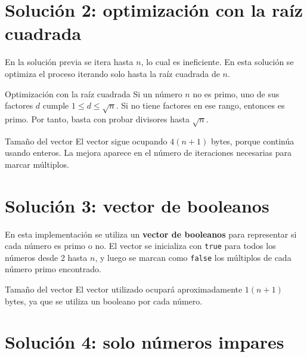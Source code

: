 \documentclass[
  spanish,
  11pt,
  a4paper,
  DIV=11,
  numbers=noendperiod]{scrartcl}
\begin{document}
\section{Solución 2: optimización con la raíz cuadrada}\label{solucion-2-optimizacion-con-la-raiz-cuadrada}

En la solución previa se itera hasta \(n\), lo cual es ineficiente. En esta solución se optimiza el proceso iterando solo hasta la raíz cuadrada de \(n\).

\begin{PracticeWarningBox}{Optimización con la raíz cuadrada}
Si un número \(n\) no es primo, uno de sus factores \(d\) cumple \(1 \le d \le \sqrt{n}\). Si no tiene factores en ese rango, entonces es primo. Por tanto, basta con probar divisores hasta \(\sqrt{n}\).
\end{PracticeWarningBox}


\begin{PracticeNoteBox}{Tamaño del vector}
El vector sigue ocupando \(4(n+1)\) bytes, porque continúa usando enteros. La mejora aparece en el número de iteraciones necesarias para marcar múltiplos.
\end{PracticeNoteBox}

\section{Solución 3: vector de booleanos}\label{solucion-3-vector-de-booleanos}

En esta implementación se utiliza un \textbf{vector de booleanos} para representar si cada número es primo o no. El vector se inicializa con \texttt{true} para todos los números desde 2 hasta \(n\), y luego se marcan como \texttt{false} los múltiplos de cada número primo encontrado.


\begin{PracticeNoteBox}{Tamaño del vector}
El vector utilizado ocupará aproximadamente \(1(n+1)\) bytes, ya que se utiliza un booleano por cada número.
\end{PracticeNoteBox}

\section{Solución 4: solo números impares}\label{solucion-4-solo-numeros-impares}
\end{document}
